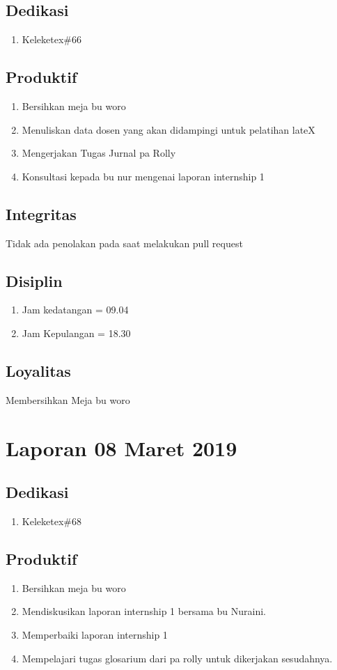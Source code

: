 \subsection{Dedikasi}
\begin{enumerate}
\item Keleketex\#66
\end{enumerate}
\subsection{Produktif}
\begin{enumerate}
\item Bersihkan meja bu woro
\item Menuliskan data dosen yang akan didampingi untuk pelatihan lateX
\item Mengerjakan Tugas Jurnal pa Rolly 
\item Konsultasi kepada bu nur mengenai laporan internship 1
\end{enumerate}
\subsection{Integritas}
Tidak ada penolakan pada saat melakukan pull request
\subsection{Disiplin}
\begin{enumerate}
\item Jam kedatangan = 09.04
\item Jam Kepulangan = 18.30
\end{enumerate}
\subsection{Loyalitas}
 Membersihkan Meja bu woro

\section{Laporan 08 Maret 2019}
\subsection{Dedikasi}
\begin{enumerate}
\item Keleketex\#68
\end{enumerate}
\subsection{Produktif}
\begin{enumerate}
\item Bersihkan meja bu woro
\item Mendiskusikan laporan internship 1 bersama bu Nuraini.
\item Memperbaiki laporan internship 1
\item Mempelajari tugas glosarium dari pa rolly untuk dikerjakan sesudahnya.
\end{enumerate}
